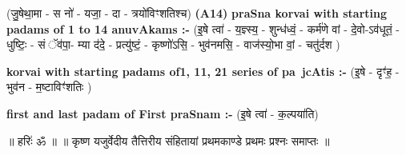 \documentclass[17pt]{extarticle}
\begin{document}
                  \newline
                      (जु॒षेथा॒मा - स नो॑ - यजा॒ - दा - त्रयो॑विꣳशतिश्च)  \textbf{(A14)} \newline \newline
                \textbf{praSna korvai with starting padams of 1 to 14 anuvAkams :-} \newline
        (इ॒षे त्वा॑ - य॒ज्ञ्स्य॒ - शुन्ध॑ध्वं॒ - कर्म॑णे वां - दे॒वो-ऽव॑धूतं॒ - धुष्टिः॒ - सं ॅव॑पा॒- म्या द॑दे॒ - प्रत्यु॑ष्टं॒ - कृष्णो॑ऽसि॒ - भुव॑नमसि॒ - वाज॑स्यो॒भा वां॒ - चतु॑र्दश ) \newline

        \textbf{korvai with starting padams of1, 11, 21 series of pa~jcAtis :-} \newline
        (इ॒षे - दृꣳ॑ह॒ - भुव॑न - म॒ष्टाविꣳ॑शतिः ) \newline

        \textbf{first and last padam of First praSnam :-} \newline
        (इ॒षे त्वा॑ - क॒ल्पया॑ति) \newline 

        
        ॥ हरिः॑ ॐ ॥
॥ कृष्ण यजुर्वेदीय तैत्तिरीय संहितायां प्रथमकाण्डे प्रथमः प्रश्नः समाप्तः ॥ \newline
        \pagebreak
                \pagebreak
        
\end{document}
